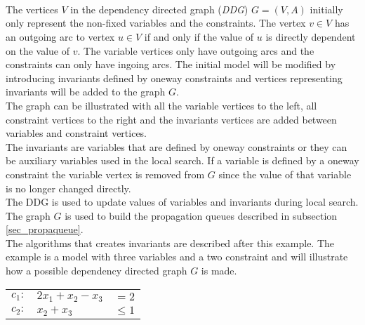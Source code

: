  \\ 
 \\
 \\
The vertices $V$ in the dependency directed graph (\emph{DDG}) $G=(V,A)$ initially only represent the non-fixed 
variables and the constraints. The vertex $v \in V$ has an outgoing arc to vertex $u \in V$ if and only if the value of 
$u$ is directly dependent on the value of $v$. The variable vertices only have outgoing arcs and the constraints can 
only have ingoing arcs. The initial model will be modified by introducing invariants defined by oneway constraints and 
vertices representing invariants will be added to the graph $G$. \\
The graph can be illustrated with all the variable vertices to the left, all constraint vertices to the right and the 
invariants vertices are added between variables and constraint vertices.  \\  
The invariants are variables that are defined by oneway constraints or they can be auxiliary variables used in the local 
search. If a variable is defined by a oneway constraint the variable vertex is removed from $G$ since the value of that 
variable is no longer changed directly.  \\  
The DDG is used to update values of variables and invariants during local search. The graph $G$ is used to build the 
propagation queues described in subsection \ref{sec_propaqueue}. \\
The algorithms that creates invariants are described after this example. The example is a model with three variables 
and a two constraint and will illustrate how a possible dependency directed graph $G$ is made. 
\begin{center}
\begin{tabular}{rlr}
$ c_1: $&$2x_1 + x_2 - x_3 $&$= 2$ \\
$ c_2: $&$x_2 + x_3 $&$\leq 1$ \\
\end{tabular} 
\end{center}
